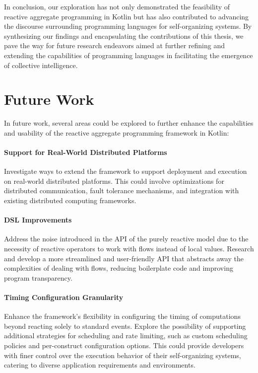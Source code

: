 In conclusion, our exploration has not only demonstrated the feasibility of reactive aggregate programming in Kotlin but has also contributed to advancing the discourse surrounding programming languages for self-organizing systems. By synthesizing our findings and encapsulating the contributions of this thesis, we pave the way for future research endeavors aimed at further refining and extending the capabilities of programming languages in facilitating the emergence of collective intelligence.

\section{Future Work}

In future work, several areas could be explored to further enhance the capabilities and usability of the reactive aggregate programming framework in Kotlin:

\paragraph{Support for Real-World Distributed Platforms}

Investigate ways to extend the framework to support deployment and execution on real-world distributed platforms. This could involve optimizations for distributed communication, fault tolerance mechanisms, and integration with existing distributed computing frameworks.

\paragraph{DSL Improvements}

Address the noise introduced in the API of the purely reactive model due to the necessity of reactive operators to work with flows instead of local values. Research and develop a more streamlined and user-friendly API that abstracts away the complexities of dealing with flows, reducing boilerplate code and improving program transparency.

\paragraph{Timing Configuration Granularity}

Enhance the framework's flexibility in configuring the timing of computations beyond reacting solely to standard events. Explore the possibility of supporting additional strategies for scheduling and rate limiting, such as custom scheduling policies and per-construct configuration options. This could provide developers with finer control over the execution behavior of their self-organizing systems, catering to diverse application requirements and environments.

